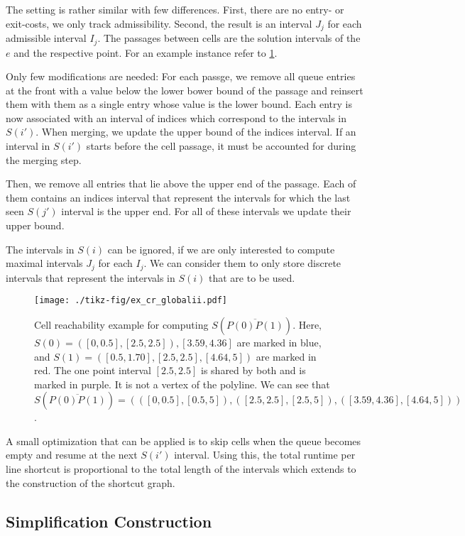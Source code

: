 The setting is rather similar with few differences. First, there are no entry- or exit-costs, we only track admissibility. Second, the result is an interval \(J_j\) for each admissible interval \(I_j\). The passages between cells are the solution intervals of the \(e\) and the respective point. For an example instance refer to \cref{fig:ex_cr_globalii}.

Only few modifications are needed: For each passge, we remove all queue entries at the front with a value below the lower bower bound of the passage and reinsert them with them as a single entry whose value is the lower bound. Each entry is now associated with an interval of indices which correspond to the intervals in \(S(i')\). When merging, we update the upper bound of the indices interval. If an interval in \(S(i')\) starts before the cell passage, it must be accounted for during the merging step.

Then, we remove all entries that lie above the upper end of the passage. Each of them contains an indices interval that represent  the intervals for which the last seen \(S(j')\) interval is the upper end. For all of these intervals we update their upper bound.

The intervals in \(S(i)\) can be ignored, if we are only interested to compute maximal intervals \(J_j\) for each \(I_j\). We can consider them to only store discrete intervals that represent the intervals in \(S(i)\) that are to be used.

\begin{figure}[htb]
  \centering
  \texttt{[image: ./tikz-fig/ex\_cr\_globalii.pdf]}
	\caption{Cell reachability example for computing \(S(\overline{P(0)P(1)})\). Here, \(S(0) = ([0, 0.5], [2.5, 2.5]), [3.59, 4.36]\) are marked in blue, and \(S(1) = ([0.5, 1.70], [2.5, 2.5], [4.64, 5])\) are marked in red. The one point interval \([2.5,2.5]\) is shared by both and is marked in purple. It is not a vertex of the polyline. We can see that \(S(\overline{P(0)P(1)}) = (([0,0.5], [0.5,5]), ([2.5,2.5],[2.5,5]), ([3.59,4.36],[4.64,5]))\).}
  \label{fig:ex_cr_globalii}
\end{figure}

A small optimization that can be applied is to skip cells when the queue becomes empty and resume at the next \(S(i')\) interval. Using this, the total runtime per line shortcut is proportional to the total length of the intervals which extends to the construction of the shortcut graph.

\subsection{Simplification Construction}

